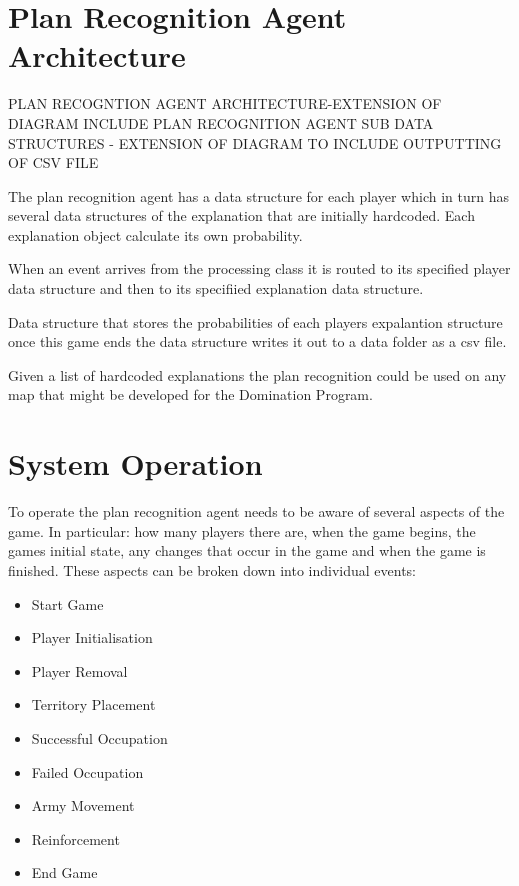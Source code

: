 \documentclass[parskip]{cs4rep}
\begin{document}
\newpage

\section{Plan Recognition Agent Architecture}

PLAN RECOGNTION AGENT ARCHITECTURE-EXTENSION OF DIAGRAM INCLUDE PLAN RECOGNITION AGENT SUB DATA STRUCTURES - EXTENSION OF DIAGRAM TO INCLUDE OUTPUTTING OF CSV FILE

The plan recognition agent has a data structure for each player which in turn has several data structures of the explanation that are initially hardcoded. Each explanation object calculate its own probability.

When an event arrives from the processing class it is routed to its specified player data structure and then to its specifiied explanation data structure.

Data structure that stores the probabilities of each players expalantion structure once this game ends the data structure writes it out to a data folder as a csv file.

Given a list of hardcoded explanations the plan recognition could be used on any map that might be developed for the Domination Program.

\section{System Operation}

To operate the plan recognition agent needs to be aware of several aspects of the game. In particular: how many players there are, when the game begins, the games initial state, any changes that occur in the game and when the game is finished. These aspects can be broken down into individual events:

\begin{itemize}
\item
Start Game
\item
Player Initialisation
\item
Player Removal
\item
Territory Placement
\item
Successful Occupation
\item
Failed Occupation
\item
Army Movement
\item
Reinforcement
\item
End Game
\end{itemize}
\end{document}
